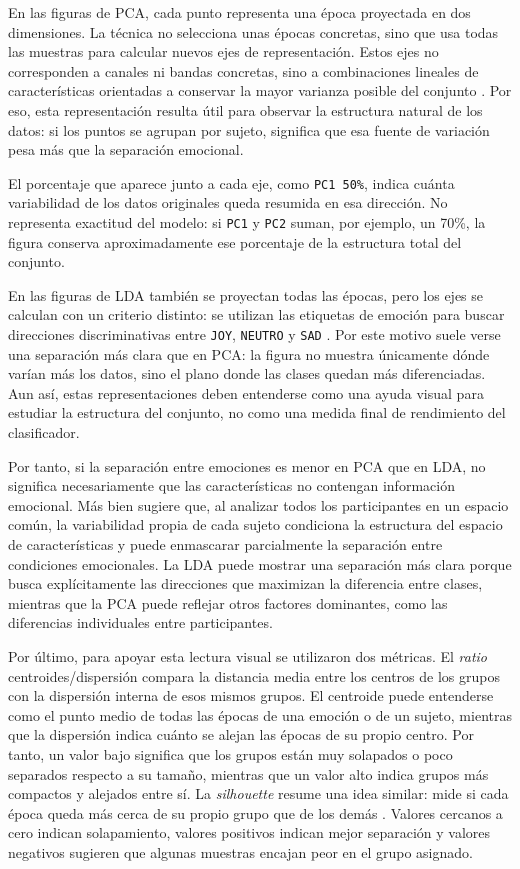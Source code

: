 En las figuras de \ac{PCA}, cada punto representa una época proyectada en dos dimensiones. La técnica no selecciona unas épocas concretas, sino que usa todas las muestras para calcular nuevos ejes de representación. Estos ejes no corresponden a canales ni bandas concretas, sino a combinaciones lineales de características orientadas a conservar la mayor varianza posible del conjunto \cite{sklearnPcaDocs}. Por eso, esta representación resulta útil para observar la estructura natural de los datos: si los puntos se agrupan por sujeto, significa que esa fuente de variación pesa más que la separación emocional.


El porcentaje que aparece junto a cada eje, como \texttt{PC1 50\%}, indica cuánta variabilidad de los datos originales queda resumida en esa dirección. No representa exactitud del modelo: si \texttt{PC1} y \texttt{PC2} suman, por ejemplo, un 70\%, la figura conserva aproximadamente ese porcentaje de la estructura total del conjunto.

En las figuras de \ac{LDA} también se proyectan todas las épocas, pero los ejes se calculan con un criterio distinto: se utilizan las etiquetas de emoción para buscar direcciones discriminativas entre \texttt{JOY}, \texttt{NEUTRO} y \texttt{SAD} \cite{sklearnLdaDocs}. Por este motivo suele verse una separación más clara que en \ac{PCA}: la figura no muestra únicamente dónde varían más los datos, sino el plano donde las clases quedan más diferenciadas. Aun así, estas representaciones deben entenderse como una ayuda visual para estudiar la estructura del conjunto, no como una medida final de rendimiento del clasificador.


Por tanto, si la separación entre emociones es menor en \ac{PCA} que en \ac{LDA}, no significa necesariamente que las características no contengan información emocional. Más bien sugiere que, al analizar todos los participantes en un espacio común, la variabilidad propia de cada sujeto condiciona la estructura del espacio de características y puede enmascarar parcialmente la separación entre condiciones emocionales. La \ac{LDA} puede mostrar una separación más clara porque busca explícitamente las direcciones que maximizan la diferencia entre clases, mientras que la \ac{PCA} puede reflejar otros factores dominantes, como las diferencias individuales entre participantes.

Por último, para apoyar esta lectura visual se utilizaron dos métricas. El \textit{ratio} centroides/dispersión compara la distancia media entre los centros de los grupos con la dispersión interna de esos mismos grupos. El centroide puede entenderse como el punto medio de todas las épocas de una emoción o de un sujeto, mientras que la dispersión indica cuánto se alejan las épocas de su propio centro. Por tanto, un valor bajo significa que los grupos están muy solapados o poco separados respecto a su tamaño, mientras que un valor alto indica grupos más compactos y alejados entre sí. La \textit{silhouette} resume una idea similar: mide si cada época queda más cerca de su propio grupo que de los demás \cite{rousseeuw1987silhouettes}. Valores cercanos a cero indican solapamiento, valores positivos indican mejor separación y valores negativos sugieren que algunas muestras encajan peor en el grupo asignado.

